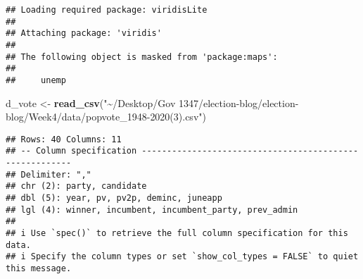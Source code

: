 \documentclass[
]{article}
\newenvironment{Shaded}{\begin{snugshade}}{\end{snugshade}}
\newcommand{\AttributeTok}[1]{\textcolor[rgb]{0.13,0.29,0.53}{#1}}
\newcommand{\DecValTok}[1]{\textcolor[rgb]{0.00,0.00,0.81}{#1}}
\newcommand{\FunctionTok}[1]{\textcolor[rgb]{0.13,0.29,0.53}{\textbf{#1}}}
\newcommand{\NormalTok}[1]{#1}
\newcommand{\OtherTok}[1]{\textcolor[rgb]{0.56,0.35,0.01}{#1}}
\newcommand{\SpecialCharTok}[1]{\textcolor[rgb]{0.81,0.36,0.00}{\textbf{#1}}}
\newcommand{\StringTok}[1]{\textcolor[rgb]{0.31,0.60,0.02}{#1}}
\begin{document}
\begin{verbatim}
## Loading required package: viridisLite
## 
## Attaching package: 'viridis'
## 
## The following object is masked from 'package:maps':
## 
##     unemp
\end{verbatim}

\begin{Shaded}
\begin{Highlighting}[]
\NormalTok{d\_vote }\OtherTok{\textless{}{-}} \FunctionTok{read\_csv}\NormalTok{(}\StringTok{"\textasciitilde{}/Desktop/Gov 1347/election{-}blog/election{-}blog/Week4/data/popvote\_1948{-}2020(3).csv"}\NormalTok{)}
\end{Highlighting}
\end{Shaded}

\begin{verbatim}
## Rows: 40 Columns: 11
## -- Column specification --------------------------------------------------------
## Delimiter: ","
## chr (2): party, candidate
## dbl (5): year, pv, pv2p, deminc, juneapp
## lgl (4): winner, incumbent, incumbent_party, prev_admin
## 
## i Use `spec()` to retrieve the full column specification for this data.
## i Specify the column types or set `show_col_types = FALSE` to quiet this message.
\end{verbatim}

\begin{Shaded}
\end{Shaded}
\end{document}
